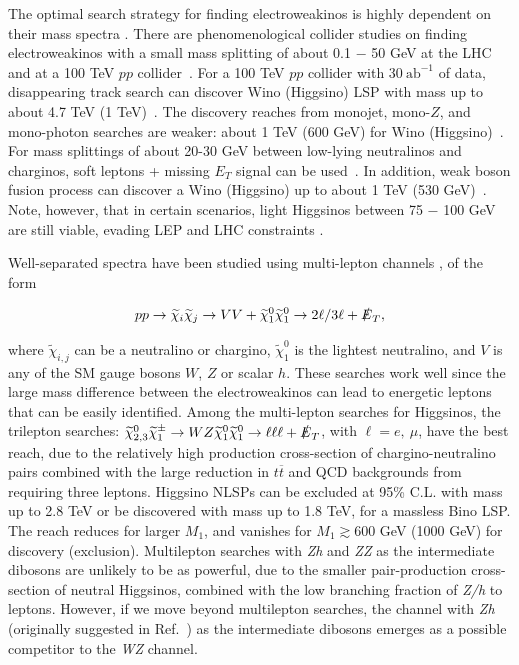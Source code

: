 \documentclass[a4paper,11pt]{article}
\newcommand{\N}{\widetilde{\chi}^0}
\newcommand{\C}{\widetilde{\chi}^\pm}
\newcommand{\met}{{\slashed{E}_T}}
\begin{document}
The optimal search strategy for finding electroweakinos is highly dependent on
their mass spectra \cite{Han:2013kza}. There are phenomenological collider
studies on finding electroweakinos with a small mass splitting of about 0.1 $-$
50 GeV at the LHC~\cite{Giudice:2010wb, Gori:2013ala, Han:2013usa,
Schwaller:2013baa, Baer:2014cua, Han:2014kaa} and at a 100 TeV $pp$
collider~\cite{Low:2014cba, Bramante:2014tba, Berlin:2015aba, Cirelli:2014dsa,
Mahbubani:2017gjh, Mahbubani:2018tin, Fukuda:2017jmk,
Saito:2019rtg, Han:2018wus}. For a 100 TeV $pp$ collider with $30\
\text{ab}^{-1}$ of data, disappearing track search can discover Wino (Higgsino)
LSP with mass up to about 4.7 TeV (1
TeV)~\cite{Low:2014cba, Cirelli:2014dsa, Mahbubani:2017gjh, Saito:2019rtg, Han:2018wus}.
The discovery reaches from monojet, mono-$Z$, and mono-photon searches are weaker:
about 1 TeV (600 GeV) for Wino
(Higgsino)~\cite{Low:2014cba, Cirelli:2014dsa, Mahbubani:2018tin, Han:2018wus}.
For mass splittings of about 20-30 GeV between low-lying neutralinos and
charginos, soft leptons + missing $E_T$ signal can be
used~\cite{Low:2014cba, Bramante:2014tba}.  In addition, weak boson fusion
process can discover a Wino (Higgsino) up to about 1 TeV (530
GeV)~\cite{Cirelli:2014dsa, Berlin:2015aba}.  Note, however,  that in certain
scenarios, light Higgsinos between 75 $-$ 100 GeV are still viable, evading LEP
and LHC constraints \cite{Egana-Ugrinovic:2018roi}.

Well-separated spectra have been studied using multi-lepton channels
\cite{Gori:2014oua, Acharya:2014pua}, of the form 

\begin{align}
  pp\rightarrow \widetilde{\chi}_i\widetilde{\chi}_j\rightarrow VV +
  \N_1\N_1\rightarrow 2\ell/3\ell + \met,
\end{align} 

\noindent where $\widetilde{\chi}_{i,j}$ can be a neutralino or chargino, $\N_1$
is the lightest neutralino, and $V$ is any of the SM gauge bosons $W$, $Z$
or scalar $h$.  These searches work well since the large mass difference
between the electroweakinos can lead to energetic leptons that can be easily
identified. Among the multi-lepton searches for Higgsinos, the trilepton
searches: $\N_{2,3}\C_1\rightarrow WZ\N_1\N_1\rightarrow \ell\ell\ell +
\met$, with $\ell=e, \ \mu$,  have the best reach, due to the relatively high
production cross-section of chargino-neutralino pairs combined with the large
reduction in $t\overline{t}$ and QCD backgrounds from requiring three
leptons.  Higgsino NLSPs can be excluded at 95\% C.L. with mass up to 2.8 TeV
or be discovered with  mass up to 1.8 TeV, for a massless Bino LSP.   The reach
reduces for larger $M_1$, and vanishes for $M_1\gtrsim 600$ GeV (1000 GeV)
for discovery (exclusion).  Multilepton searches with \emph{Zh} and \emph{ZZ}
as the intermediate dibosons are unlikely to be as powerful, due to the smaller
pair-production cross-section of neutral Higgsinos, combined with the low
branching fraction of \emph{Z/h} to leptons. However, if we move beyond
multilepton searches, the channel with \emph{Zh} (originally suggested in
Ref.~\cite{Han:2013kza}) as the intermediate dibosons emerges as a possible
competitor to the \emph{WZ} channel.  
\end{document}
